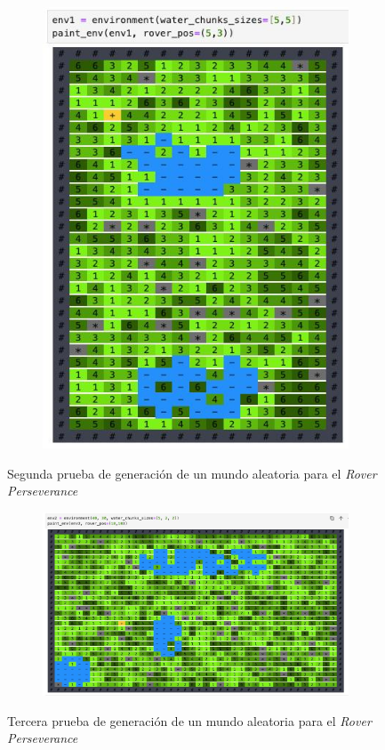 \documentclass[12pt, letterpaper]{article}
\begin{document}
    \begin{figure}[h!]
        \centering
        \begin{subfigure}[h!]{0.45\textwidth}
            \centering
            \includegraphics[scale=0.25,angle=0]{env1.jpeg}
        \end{subfigure}
        \hfill
        \centering
        \caption{Segunda prueba de generación de un mundo aleatoria para el \textit{Rover Perseverance}}\label{env1}
    \end{figure}

    \begin{figure}[h!]
        \centering
        \begin{subfigure}[h!]{0.45\textwidth}
            \centering
            \includegraphics[scale=0.16,angle=0]{env2.jpeg}
        \end{subfigure}
        \hfill
        \centering
        \caption{Tercera prueba de generación de un mundo aleatoria para el \textit{Rover Perseverance}}\label{env2}
    \end{figure}
\end{document}
